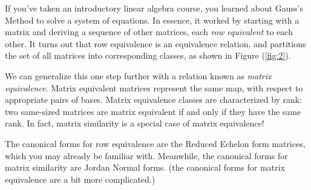 \documentclass{article}
\begin{document}
        \vspace{3mm}
        If you've taken an introductory linear algebra course, you learned about Gauss's Method to solve a system of equations. In essence, it worked by starting with a matrix and deriving a sequence of other matrices, each \textit{row equivalent} to each other. It turns out that row equivalence is an equivalence relation, and partitions the set of all matrices into corresponding classes, as shown in Figure (\ref{fig:2}).

        \vspace{3mm}
        We can generalize this one step further with a relation known as \textit{matrix equivalence}. Matrix equivalent matrices represent the same map, with respect to appropriate pairs of bases. Matrix equivalence classes are characterized by rank: two same-sized matrices are matrix equivalent if and only if they have the same rank. In fact, matrix similarity is a special case of matrix equivalence!

        \vspace{3mm}
         The canonical forms for row equivalence are the Reduced Echelon form matrices, which you may already be familiar with. Meanwhile, the canonical forms for matrix similarity are Jordan Normal forms. (the canonical forms for matrix equivalence are a bit more complicated.)
        
\end{document}
